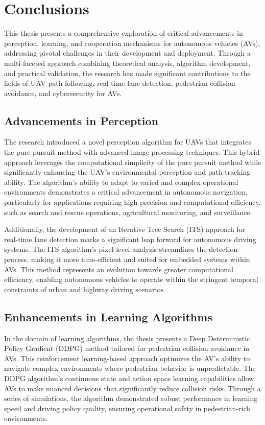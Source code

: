 \chapter*{Conclusions}


This thesis presents a comprehensive exploration of critical advancements in perception, learning, and cooperation mechanisms for autonomous vehicles (AVs), addressing pivotal challenges in their development and deployment. Through a multi-faceted approach combining theoretical analysis, algorithm development, and practical validation, the research has made significant contributions to the fields of UAV path following, real-time lane detection, pedestrian collision avoidance, and cybersecurity for AVs.

\section*{Advancements in Perception}

The research introduced a novel perception algorithm for UAVs that integrates the pure pursuit method with advanced image processing techniques. This hybrid approach leverages the computational simplicity of the pure pursuit method while significantly enhancing the UAV's environmental perception and path-tracking ability. The algorithm's ability to adapt to varied and complex operational environments demonstrates a critical advancement in autonomous navigation, particularly for applications requiring high precision and computational efficiency, such as search and rescue operations, agricultural monitoring, and surveillance.

Additionally, the development of an Iterative Tree Search (ITS) approach for real-time lane detection marks a significant leap forward for autonomous driving systems. The ITS algorithm's pixel-level analysis streamlines the detection process, making it more time-efficient and suited for embedded systems within AVs. This method represents an evolution towards greater computational efficiency, enabling autonomous vehicles to operate within the stringent temporal constraints of urban and highway driving scenarios.

\section*{Enhancements in Learning Algorithms}

In the domain of learning algorithms, the thesis presents a Deep Deterministic Policy Gradient (DDPG) method tailored for pedestrian collision avoidance in AVs. This reinforcement learning-based approach optimizes the AV's ability to navigate complex environments where pedestrian behavior is unpredictable. The DDPG algorithm's continuous state and action space learning capabilities allow AVs to make nuanced decisions that significantly reduce collision risks. Through a series of simulations, the algorithm demonstrated robust performance in learning speed and driving policy quality, ensuring operational safety in pedestrian-rich environments.


